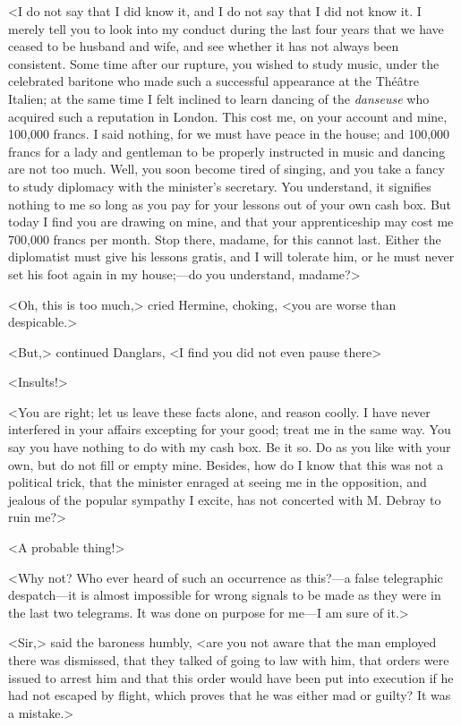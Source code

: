  <I do not say that I did know it, and I do not say that I did not know it. I merely tell you to look into my conduct during the last four years that we have ceased to be husband and wife, and see whether it has not always been consistent. Some time after our rupture, you wished to study music, under the celebrated baritone who made such a successful appearance at the Théâtre Italien; at the same time I felt inclined to learn dancing of the \textit{danseuse} who acquired such a reputation in London. This cost me, on your account and mine, 100,000 francs. I said nothing, for we must have peace in the house; and 100,000 francs for a lady and gentleman to be properly instructed in music and dancing are not too much. Well, you soon become tired of singing, and you take a fancy to study diplomacy with the minister's secretary. You understand, it signifies nothing to me so long as you pay for your lessons out of your own cash box. But today I find you are drawing on mine, and that your apprenticeship may cost me 700,000 francs per month. Stop there, madame, for this cannot last. Either the diplomatist must give his lessons gratis, and I will tolerate him, or he must never set his foot again in my house;—do you understand, madame?> 

 <Oh, this is too much,> cried Hermine, choking, <you are worse than despicable.> 

 <But,> continued Danglars, <I find you did not even pause there\longdash> 

 <Insults!> 

 <You are right; let us leave these facts alone, and reason coolly. I have never interfered in your affairs excepting for your good; treat me in the same way. You say you have nothing to do with my cash box. Be it so. Do as you like with your own, but do not fill or empty mine. Besides, how do I know that this was not a political trick, that the minister enraged at seeing me in the opposition, and jealous of the popular sympathy I excite, has not concerted with M. Debray to ruin me?> 

 <A probable thing!> 

 <Why not? Who ever heard of such an occurrence as this?—a false telegraphic despatch—it is almost impossible for wrong signals to be made as they were in the last two telegrams. It was done on purpose for me—I am sure of it.> 

 <Sir,> said the baroness humbly, <are you not aware that the man employed there was dismissed, that they talked of going to law with him, that orders were issued to arrest him and that this order would have been put into execution if he had not escaped by flight, which proves that he was either mad or guilty? It was a mistake.> 

